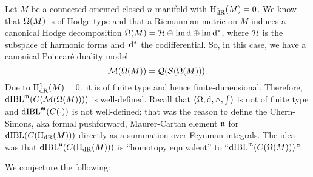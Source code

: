 \documentclass[\MainFolder/Text.tex]{subfiles}
\begin{document}

Let $M$ be a connected oriented closed $n$-manifold with $\mathrm{H}_{\mathrm{dR}}^1(M)=0$. We know that $\Omega(M)$ is of Hodge type and that a Riemannian metric on $M$ induces a canonical Hodge decomposition $\Omega(M) = \mathcal{H} \oplus \operatorname{im}\mathrm{d} \oplus \operatorname{im}\mathrm{d}^*$, where $\mathcal{H}$ is the subspace of harmonic forms and~$\mathrm{d}^*$ the codifferential. So, in this case, we have a canonical Poincar\'e duality model 
$$ \mathcal{M}(\Omega(M)) = \mathcal{Q}(\mathcal{S}(\Omega(M))). $$
Due to $\mathrm{H}_{\mathrm{dR}}^1(M)=0$, it is of finite type and hence finite-dimensional. Therefore, $\mathrm{dIBL}^{\mathfrak{m}}(C(\mathcal{M}(\Omega(M))))$ is well-defined. Recall that $(\Omega,\mathrm{d},\wedge,\int)$ is not of finite type and $\mathrm{dIBL}^{\mathfrak{m}}(C(\cdot))$ is not well-defined;
that was the reason to define the Chern-Simons, aka formal pushforward, Maurer-Cartan element $\mathfrak{n}$ for $\mathrm{dIBL}(C(\mathrm{H}_{\mathrm{dR}}(M)))$ directly as a summation over Feynman integrals. The idea was that $\mathrm{dIBL}^{\mathfrak{n}}(C(\mathrm{H}_{\mathrm{dR}}(M)))$ is ``homotopy equivalent'' to ``$\mathrm{dIBL}^{\mathfrak{m}}(C(\Omega(M)))$''.

We conjecture the following:
\end{document}
